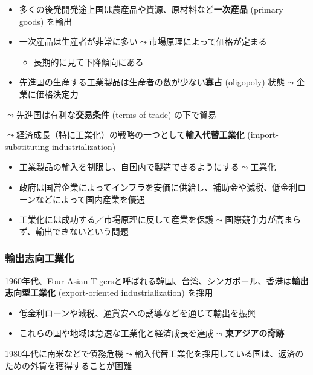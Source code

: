\documentclass[
  xelatex,
  ja=standard]{bxjsarticle}
\providecommand{\tightlist}{%
  \setlength{\itemsep}{0pt}\setlength{\parskip}{0pt}}\usepackage{longtable,booktabs,array}
\begin{document}
\begin{itemize}
\tightlist
\item
  多くの後発開発途上国は農産品や資源、原材料など\textbf{一次産品}
  (primary goods) を輸出
\item
  一次産品は生産者が非常に多い\(\leadsto\)市場原理によって価格が定まる

  \begin{itemize}
  \tightlist
  \item
    長期的に見て下降傾向にある
  \end{itemize}
\item
  先進国の生産する工業製品は生産者の数が少ない\textbf{寡占} (oligopoly)
  状態\(\leadsto\)企業に価格決定力
\end{itemize}

\(\leadsto\)先進国は有利な\textbf{交易条件} (terms of trade) の下で貿易

\(\leadsto\)経済成長（特に工業化）の戦略の一つとして\textbf{輸入代替工業化}
(import-substituting industrialization)

\begin{itemize}
\tightlist
\item
  工業製品の輸入を制限し、自国内で製造できるようにする\(\leadsto\)工業化
\item
  政府は国営企業によってインフラを安価に供給し、補助金や減税、低金利ローンなどによって国内産業を優遇
\item
  工業化には成功する／市場原理に反して産業を保護\(\leadsto\)国際競争力が高まらず、輸出できないという問題
\end{itemize}

\hypertarget{ux8f38ux51faux5fd7ux5411ux5de5ux696dux5316}{%
\subsubsection{輸出志向工業化}\label{ux8f38ux51faux5fd7ux5411ux5de5ux696dux5316}}

1960年代、Four Asian
Tigersと呼ばれる韓国、台湾、シンガポール、香港は\textbf{輸出志向型工業化}
(export-oriented industrialization) を採用

\begin{itemize}
\tightlist
\item
  低金利ローンや減税、通貨安への誘導などを通じて輸出を振興
\item
  これらの国や地域は急速な工業化と経済成長を達成\(\leadsto\)\textbf{東アジアの奇跡}
\end{itemize}

1980年代に南米などで債務危機\(\leadsto\)輸入代替工業化を採用している国は、返済のための外貨を獲得することが困難
\end{document}
